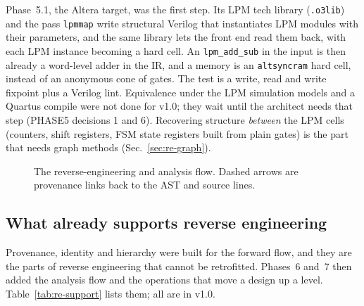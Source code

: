 \documentclass[conference]{IEEEtran}
\newcommand{\code}[1]{\texttt{#1}}
\begin{document}
Phase~5.1, the Altera target, was the first step. Its LPM tech library (\code{.o3lib}) and the
pass \code{lpmmap} write structural Verilog that instantiates LPM modules with their parameters,
and the same library lets the front end read them back, with each LPM instance becoming a hard
cell. An \code{lpm\_add\_sub} in the input is then already a word-level adder in the IR, and a
memory is an \code{altsyncram} hard cell, instead of an anonymous cone of gates. The test is a
write, read and write fixpoint plus a Verilog lint. Equivalence under the LPM simulation models
and a Quartus compile were not done for v1.0; they wait until the architect needs that step
(PHASE5 decisions 1 and 6).
Recovering structure \emph{between} the LPM cells (counters, shift registers, FSM state registers
built from plain gates) is the part that needs graph methods (Sec.~\ref{sec:re-graph}).

\begin{figure}[t]
\centering
\odinfit{\columnwidth}{}
\caption{The reverse-engineering and analysis flow. Dashed arrows are provenance links back to the AST and source lines.}
\label{fig:re}
\end{figure}

\subsection{What already supports reverse engineering}

Provenance, identity and hierarchy were built for the forward flow, and they are the parts of
reverse engineering that cannot be retrofitted. Phases~6 and~7 then added the analysis flow and
the operations that move a design up a level. Table~\ref{tab:re-support} lists them; all are
in v1.0.
\end{document}
